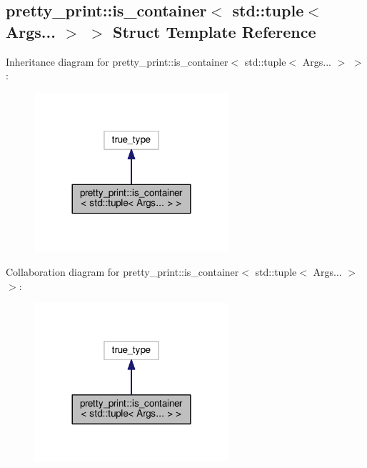 \hypertarget{structpretty__print_1_1is__container_3_01std_1_1tuple_3_01Args_8_8_8_01_4_01_4}{}\subsection{pretty\+\_\+print\+:\+:is\+\_\+container$<$ std\+:\+:tuple$<$ Args... $>$ $>$ Struct Template Reference}
\label{structpretty__print_1_1is__container_3_01std_1_1tuple_3_01Args_8_8_8_01_4_01_4}


Inheritance diagram for pretty\+\_\+print\+:\+:is\+\_\+container$<$ std\+:\+:tuple$<$ Args... $>$ $>$\+:\nopagebreak
\begin{figure}[H]
\begin{center}
\leavevmode
\includegraphics[width=204pt]{structpretty__print_1_1is__container_3_01std_1_1tuple_3_01Args_8_8_8_01_4_01_4__inherit__graph}
\end{center}
\end{figure}


Collaboration diagram for pretty\+\_\+print\+:\+:is\+\_\+container$<$ std\+:\+:tuple$<$ Args... $>$ $>$\+:\nopagebreak
\begin{figure}[H]
\begin{center}
\leavevmode
\includegraphics[width=204pt]{structpretty__print_1_1is__container_3_01std_1_1tuple_3_01Args_8_8_8_01_4_01_4__coll__graph}
\end{center}
\end{figure}



